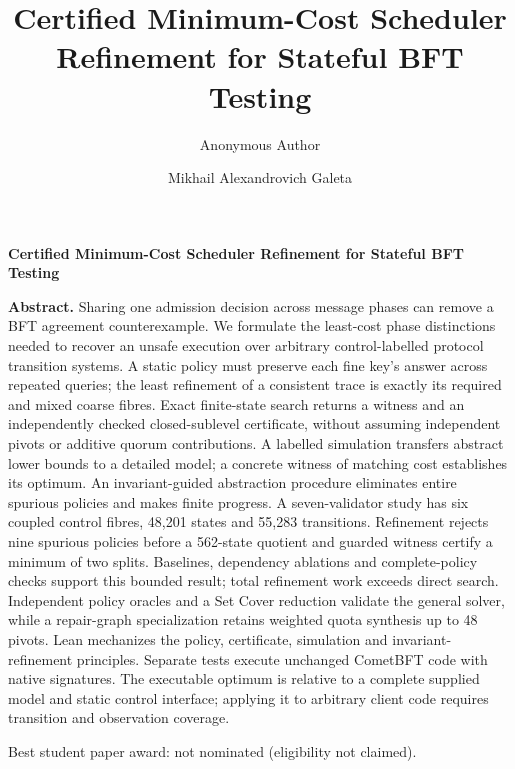 \documentclass[a4paper,USenglish,cleveref,autoref,anonymous]{lipics-v2021}
\title{Certified Minimum-Cost Scheduler Refinement for Stateful BFT Testing}
\author{Anonymous Author}{Anonymous Institution}{}{}{}
\author{Mikhail Alexandrovich Galeta}{Saint Petersburg State University of Aerospace Instrumentation (SUAI), Saint Petersburg, Russia}{}{}{}
\begin{document}
\begin{titlepage}
\centering
\vspace*{22mm}
{\LARGE\bfseries Certified Minimum-Cost Scheduler Refinement for Stateful BFT Testing\par}
\vspace{12mm}
\begin{minipage}{0.88\textwidth}
\textbf{Abstract.}
Sharing one admission decision across message phases can remove a BFT agreement counterexample. We formulate the least-cost phase distinctions needed to recover an unsafe execution over arbitrary control-labelled protocol transition systems. A static policy must preserve each fine key's answer across repeated queries; the least refinement of a consistent trace is exactly its required and mixed coarse fibres. Exact finite-state search returns a witness and an independently checked closed-sublevel certificate, without assuming independent pivots or additive quorum contributions. A labelled simulation transfers abstract lower bounds to a detailed model; a concrete witness of matching cost establishes its optimum. An invariant-guided abstraction procedure eliminates entire spurious policies and makes finite progress. A seven-validator study has six coupled control fibres, 48,201 states and 55,283 transitions. Refinement rejects nine spurious policies before a 562-state quotient and guarded witness certify a minimum of two splits. Baselines, dependency ablations and complete-policy checks support this bounded result; total refinement work exceeds direct search. Independent policy oracles and a Set Cover reduction validate the general solver, while a repair-graph specialization retains weighted quota synthesis up to 48 pivots. Lean mechanizes the policy, certificate, simulation and invariant-refinement principles. Separate tests execute unchanged CometBFT code with native signatures. The executable optimum is relative to a complete supplied model and static control interface; applying it to arbitrary client code requires transition and observation coverage.
\end{minipage}
\vfill
{\small Best student paper award: not nominated (eligibility not claimed).\par}
\end{titlepage}

\maketitle
\end{document}
